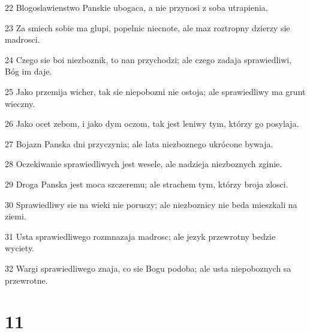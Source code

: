 \par 22 Blogoslawienstwo Panskie ubogaca, a nie przynosi z soba utrapienia.
\par 23 Za smiech sobie ma glupi, popelnic niecnote, ale maz roztropny dzierzy sie madrosci.
\par 24 Czego sie boi niezboznik, to nan przychodzi; ale czego zadaja sprawiedliwi, Bóg im daje.
\par 25 Jako przemija wicher, tak sie niepobozni nie ostoja; ale sprawiedliwy ma grunt wieczny.
\par 26 Jako ocet zebom, i jako dym oczom, tak jest leniwy tym, którzy go posylaja.
\par 27 Bojazn Panska dni przyczynia; ale lata niezboznego ukrócone bywaja.
\par 28 Oczekiwanie sprawiedliwych jest wesele, ale nadzieja niezboznych zginie.
\par 29 Droga Panska jest moca szczeremu; ale strachem tym, którzy broja zlosci.
\par 30 Sprawiedliwy sie na wieki nie poruszy; ale niezboznicy nie beda mieszkali na ziemi.
\par 31 Usta sprawiedliwego rozmnazaja madrosc; ale jezyk przewrotny bedzie wyciety.
\par 32 Wargi sprawiedliwego znaja, co sie Bogu podoba; ale usta niepoboznych sa przewrotne.

\chapter{11}

